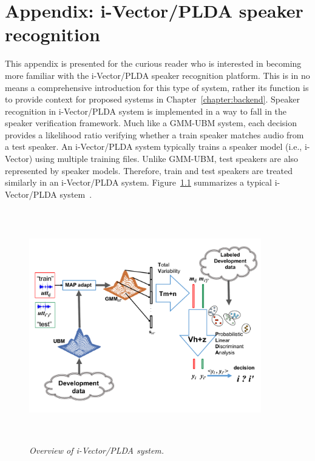 \chapter{Appendix: i-Vector/PLDA speaker recognition}
\label{appendix:ivector_plda_spkr_id}
This appendix is presented for the curious reader who is interested in becoming more familiar with the i-Vector/PLDA speaker recognition platform. 
This is in no means a comprehensive introduction for this type of system, rather its function is to provide context for proposed systems in Chapter~\ref{chapter:backend}. 
Speaker recognition in i-Vector/PLDA system is implemented in a way to fall in the speaker verification framework. 
Much like a GMM-UBM system, each decision provides a likelihood ratio verifying whether a train speaker matches audio from a test speaker. 
An i-Vector/PLDA system typically trains a speaker model (i.e., i-Vector) using multiple training files. 
Unlike GMM-UBM, test speakers are also represented by speaker models. 
Therefore, train and test speakers are treated similarly in an i-Vector/PLDA system. 
Figure~\ref{fig:ivector_plda} summarizes a typical i-Vector/PLDA system~\cite{dehak2011front}. 

\begin{figure}[h!]
	\centering
	\vspace{0mm} 
	\includegraphics[height = 4in, width=0.9\textwidth]{figures/ivector_plda}
	\vspace{-3mm}
	\caption{\it Overview of i-Vector/PLDA system.}
	\label{fig:ivector_plda}
	\vspace{-3mm}
\end{figure}

